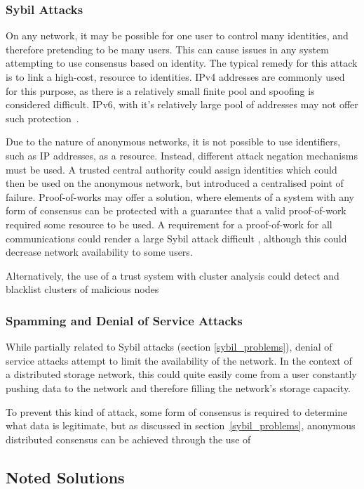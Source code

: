 		\subsubsection*{Sybil Attacks} \label{sybil_problems}
			On any network, it may be possible for one user to control many identities, and therefore pretending to be many users. This can cause issues in any system attempting to use consensus based on identity. The typical remedy for this attack is to link a high-cost, resource to identities. IPv4 addresses are commonly used for this purpose, as there is a relatively small finite pool and spoofing is considered difficult. IPv6, with it's relatively large pool of addresses may not offer such protection~\cite{cholez2009evaluation}.
			
			Due to the nature of anonymous networks, it is not possible to use identifiers, such as IP addresses, as a resource. Instead, different attack negation mechanisms must be used. A trusted central authority could assign identities which could then be used on the anonymous network, but introduced a centralised point of failure. Proof-of-works may offer a solution, where elements of a system with any form of consensus can be protected with a guarantee that a valid proof-of-work required some resource to be used. A requirement for a proof-of-work for all communications could render a large Sybil attack difficult \cite{borisov2006computational}, although this could decrease network availability to some users.
		
			Alternatively, the use of a trust system with cluster analysis could detect and blacklist clusters of malicious nodes
		\subsubsection*{Spamming and Denial of Service Attacks}
			While partially related to Sybil attacks (section \ref{sybil_problems}), denial of service attacks attempt to limit the availability of the network. In the context of a distributed storage network, this could quite easily come from a user constantly pushing data to the network and therefore filling the network's storage capacity.
			
			To prevent this kind of attack, some form of consensus is required to determine what data is legitimate, but as discussed in section~\ref{sybil_problems}, anonymous distributed consensus can be achieved through the use of 
	\subsection{Noted Solutions}
